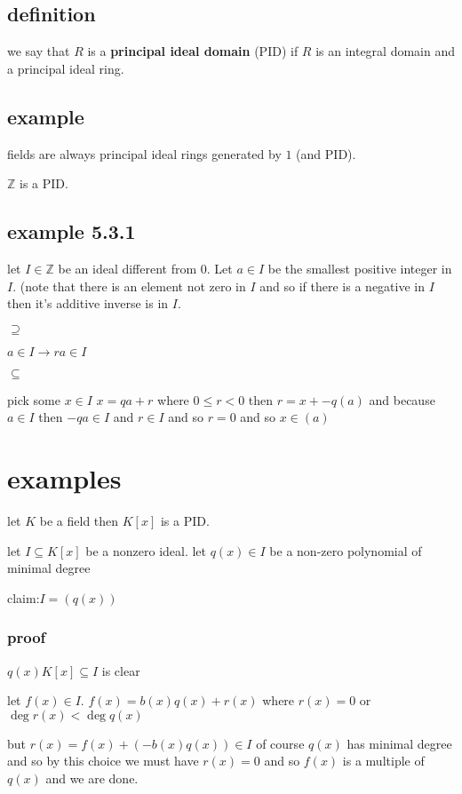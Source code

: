 \documentclass[letterpaper]{article}
\begin{document}
\subsection*{definition}
we say that $R$ is a {\bfseries principal ideal domain} (PID) if $R$ is an integral domain and a principal ideal ring.

\subsection*{example}
fields are always principal ideal rings generated by $1$ (and PID).

$\mathbb{Z}$ is a PID.
\subsection*{example 5.3.1}
let $I\in \mathbb{Z}$ be an ideal different from 0. Let $a\in I$ be the smallest positive integer in $I$. (note that there is an element not zero in $I$ and so if there is a negative in $I$ then it's additive inverse is in $I$.

$\supseteq$

$a\in I\to ra\in I$

$\subseteq$

pick some $x\in I$ $x=qa+r$ where $0\le  r<0$ then $r=x+-q(a)$ and because $a\in I$ then $-qa\in I$ and $r\in I$ and so $r=0$ and so $x\in (a)$

\section*{examples}
let $K$ be a field then $K[x]$ is a PID.

let $I\subseteq K[x]$ be a nonzero ideal. let $q(x)\in I$ be a non-zero polynomial of minimal degree

claim:$I=(q(x))$
\subsubsection*{proof}
$q(x)K[x]\subseteq I$ is clear

let $f(x)\in I$. $f(x)=b(x)q(x)+r(x)$ where $r(x)=0$ or $\deg r(x)<\deg q(x)$

but $r(x)=f(x)+(-b(x)q(x))\in I$ of course $q(x)$ has minimal degree and so by this choice we must have $r(x)=0$ and so $f(x)$ is a multiple of $q(x)$ and we are done.
\end{document}
